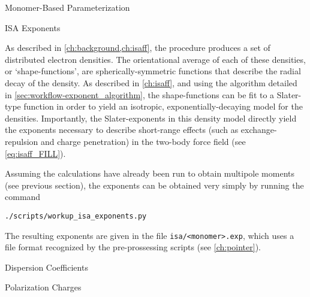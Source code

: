 \begin{section}{Monomer-Based Parameterization}
\begin{subsection}{ISA Exponents}

As described in \cref{ch:background,ch:isaff}, the \isa procedure
produces a set of distributed \aim electron densities. The
orientational average of each of these \aim densities, or
`shape-functions', are spherically-symmetric functions that describe the
radial decay of the \aim density.\cite{Misquitta2014} As described in
\cref{ch:isaff}, and using the algorithm detailed in 
\cref{sec:workflow-exponent_algorithm},
the shape-functions can be fit to a Slater-type function in
order to yield an isotropic, exponentially-decaying model for the \isa
densities. Importantly, the Slater-exponents in this density model directly
yield the exponents necessary to describe short-range effects (such as
exchange-repulsion and charge penetration) in the two-body force
field (see \cref{eq:isaff_FILL}).

Assuming the \isa calculations have already been run to obtain multipole
moments (see previous section), the \isa exponents can be obtained very simply
by running the command
%
\begin{lstlisting}
./scripts/workup_isa_exponents.py
\end{lstlisting}
%
The resulting exponents are given in the file \verb|isa/<monomer>.exp|, which
uses a file format recognized by the \pointer pre-prossessing scripts (see
\cref{ch:pointer}).

\end{subsection}


\begin{subsection}{Dispersion Coefficients}
\label{sec:workflow-dispersion}



\end{subsection}

\begin{subsection}{Polarization Charges}
\label{sec:workflow-polarizabilities}

\end{subsection}

\end{section}
